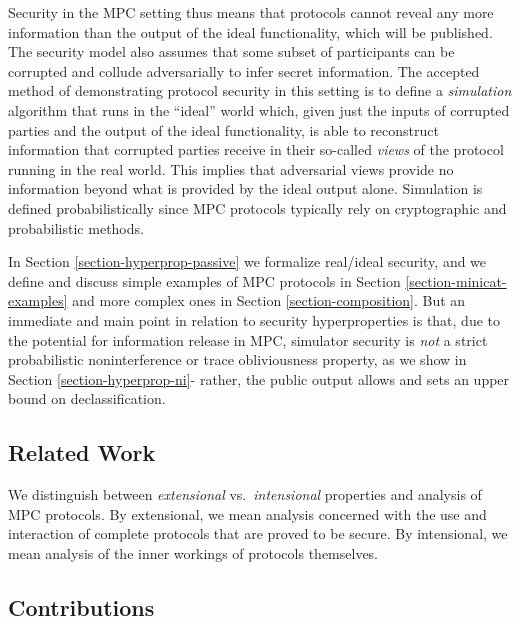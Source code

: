 Security in the MPC setting thus means that protocols cannot reveal
any more information than the output of the ideal functionality, which
will be published. The security model also assumes that some subset of
participants can be corrupted and collude adversarially to infer
secret information. The accepted method of demonstrating protocol
security in this setting is to define a \emph{simulation} algorithm
that runs in the ``ideal'' world which, given just the inputs of
corrupted parties and the output of the ideal functionality, is able
to reconstruct information that corrupted parties receive in their
so-called \emph{views} of the protocol running in the real world.
This implies that adversarial views provide no information beyond what
is provided by the ideal output alone. Simulation is defined
probabilistically since MPC protocols typically rely on cryptographic
and probabilistic methods.

In Section \ref{section-hyperprop-passive} we formalize real/ideal
security, and we define and discuss simple examples of MPC protocols
in Section \ref{section-minicat-examples} and more complex ones in
Section \ref{section-composition}. But an immediate and main point in
relation to security hyperproperties is that, due to the potential for
information release in MPC, simulator security is \emph{not} a strict
probabilistic noninterference or trace obliviousness property, as we
show in Section \ref{section-hyperprop-ni}- rather, the public output
allows and sets an upper bound on declassification.

\subsection{Related Work}

We distinguish between \emph{extensional} vs.~\emph{intensional}
properties and analysis of MPC protocols. By extensional, we mean
analysis concerned with the use and interaction of complete protocols
that are proved to be secure. By intensional, we mean analysis of the
inner workings of protocols themselves. 

\subsection{Contributions}


